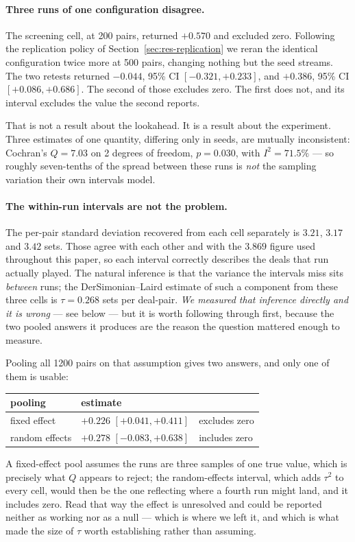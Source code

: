 \documentclass[11pt,a4paper]{article}
\begin{document}
\paragraph{Three runs of one configuration disagree.} The screening cell, at 200
pairs, returned $+0.570$ and excluded zero. Following the replication policy of
Section~\ref{sec:res-replication} we reran the identical configuration twice
more at 500 pairs, changing nothing but the seed streams. The two retests
returned $-0.044$, 95\% CI $[-0.321, +0.233]$, and $+0.386$, 95\% CI
$[+0.086, +0.686]$. The second of those excludes zero. The first does not, and
its interval excludes the value the second reports.

That is not a result about the lookahead. It is a result about the experiment.
Three estimates of one quantity, differing only in seeds, are mutually
inconsistent: Cochran's $Q = 7.03$ on 2 degrees of freedom, $p = 0.030$, with
$I^2 = 71.5\%$ --- so roughly seven-tenths of the spread between these runs is
\emph{not} the sampling variation their own intervals model.

\paragraph{The within-run intervals are not the problem.} The per-pair standard
deviation recovered from each cell separately is $3.21$, $3.17$ and $3.42$ sets.
Those agree with each other and with the $3.869$ figure used throughout this
paper, so each interval correctly describes the deals that run actually played.
The natural inference is that the variance the intervals miss sits \emph{between}
runs; the DerSimonian--Laird estimate of such a component from these three cells
is $\tau = 0.268$ sets per deal-pair. \emph{We measured that inference directly
and it is wrong} --- see below --- but it is worth following through first,
because the two pooled answers it produces are the reason the question mattered
enough to measure.

Pooling all 1200 pairs on that assumption gives two answers, and only one of
them is usable:
\begin{center}
\begin{tabular}{lll}
\toprule
pooling & estimate & \\
\midrule
fixed effect   & $+0.226$ $[+0.041, +0.411]$ & excludes zero \\
random effects & $+0.278$ $[-0.083, +0.638]$ & includes zero \\
\bottomrule
\end{tabular}
\end{center}
A fixed-effect pool assumes the runs are three samples of one true value, which
is precisely what $Q$ appears to reject; the random-effects interval, which adds
$\tau^2$ to every cell, would then be the one reflecting where a fourth run might
land, and it includes zero. Read that way the effect is unresolved and could be
reported neither as working nor as a null --- which is where we left it, and
which is what made the size of $\tau$ worth establishing rather than assuming.
\end{document}

